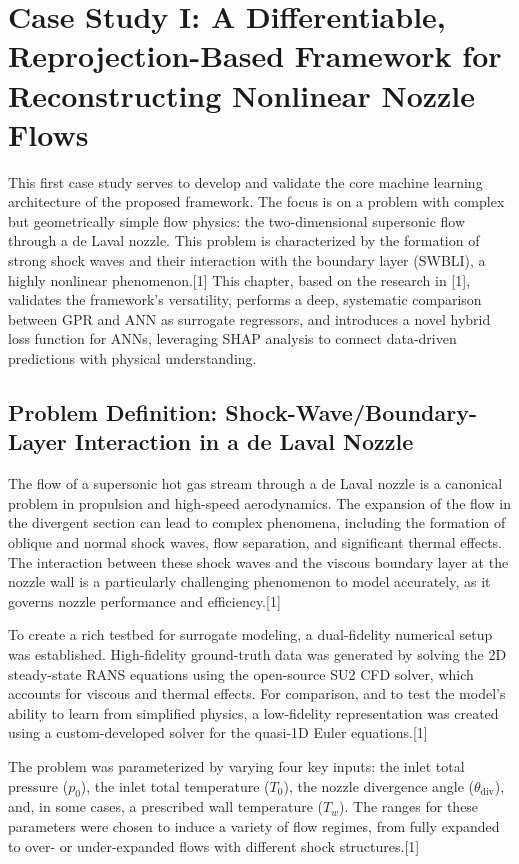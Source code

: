 \documentclass[12pt, a4paper]{report}
\begin{document}
\chapter{Case Study I: A Differentiable, Reprojection-Based Framework for Reconstructing Nonlinear Nozzle Flows}

This first case study serves to develop and validate the core machine learning architecture of the proposed framework. The focus is on a problem with complex but geometrically simple flow physics: the two-dimensional supersonic flow through a de Laval nozzle. This problem is characterized by the formation of strong shock waves and their interaction with the boundary layer (SWBLI), a highly nonlinear phenomenon.[1] This chapter, based on the research in [1], validates the framework's versatility, performs a deep, systematic comparison between GPR and ANN as surrogate regressors, and introduces a novel hybrid loss function for ANNs, leveraging SHAP analysis to connect data-driven predictions with physical understanding.

\section{Problem Definition: Shock-Wave/Boundary-Layer Interaction in a de Laval Nozzle}

The flow of a supersonic hot gas stream through a de Laval nozzle is a canonical problem in propulsion and high-speed aerodynamics. The expansion of the flow in the divergent section can lead to complex phenomena, including the formation of oblique and normal shock waves, flow separation, and significant thermal effects. The interaction between these shock waves and the viscous boundary layer at the nozzle wall is a particularly challenging phenomenon to model accurately, as it governs nozzle performance and efficiency.[1]

To create a rich testbed for surrogate modeling, a dual-fidelity numerical setup was established. High-fidelity ground-truth data was generated by solving the 2D steady-state RANS equations using the open-source SU2 CFD solver, which accounts for viscous and thermal effects. For comparison, and to test the model's ability to learn from simplified physics, a low-fidelity representation was created using a custom-developed solver for the quasi-1D Euler equations.[1]

The problem was parameterized by varying four key inputs: the inlet total pressure ($p_0$), the inlet total temperature ($T_0$), the nozzle divergence angle ($\theta_{\text{div}}$), and, in some cases, a prescribed wall temperature ($T_w$). The ranges for these parameters were chosen to induce a variety of flow regimes, from fully expanded to over- or under-expanded flows with different shock structures.[1]
\end{document}
